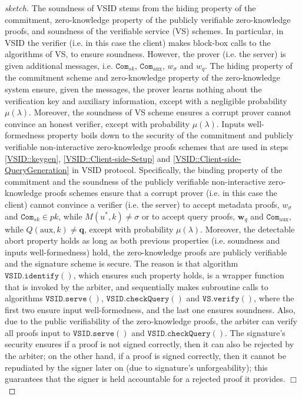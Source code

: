 
\begin{proof}[sketch] The soundness  of VSID  stems  from the hiding property of the commitment, zero-knowledge property of the publicly verifiable zero-knowledge proofs, and soundness of  the  verifiable service (VS) schemes. In particular, in VSID the verifier (i.e. in this case the client) makes block-box calls to the algorithms of   VS, to ensure soundness. However, the prover (i.e.  the server) is given  additional messages, i.e.   $\mathtt{Com}_{\scriptscriptstyle sk}$,  $\mathtt{Com}_{\scriptscriptstyle \text{aux}}$, $w_{\scriptscriptstyle\sigma}$ and $w_{\scriptscriptstyle q}$. The hiding property of the commitment scheme and zero-knowledge property of the zero-knowledge system ensure, given the messages, the prover learns nothing about the verification key and auxiliary information, except with a negligible probability $\mu(\lambda)$. Moreover, the soundness of VS scheme ensures a corrupt prover cannot convince an honest verifier, except with  probability $\mu(\lambda)$.   Inputs well-formedness property boils down to the security of the commitment and publicly verifiable non-interactive zero-knowledge proofs   schemes that are used in steps \ref{VSID::keygen}, \ref{VSID::Client-side-Setup} and \ref{VSID::Client-side-QueryGeneration} in VSID protocol. Specifically,  the binding property of the commitment and the soundness of the publicly verifiable non-interactive zero-knowledge proofs schemes  ensure that a corrupt prover (i.e. in this case the client) cannot convince a verifier (i.e. the server) to accept metadata proofs, $w_{\scriptscriptstyle\sigma}$ and $\mathtt{Com}_{\scriptscriptstyle sk}\in pk$, while  $M(u^{\scriptscriptstyle *},k)\neq \sigma $ or to accept query proofs, $\bm{w}_{\scriptscriptstyle q}$ and $\mathtt{Com}_{\scriptscriptstyle \text{aux}}$, while $Q(\text{aux},k)\neq \bm{q}$, except with  probability $\mu(\lambda)$.  Moreover, the detectable abort property holds as long as both previous properties (i.e. soundness and inputs well-formedness) hold, the zero-knowledge proofs are publicly verifiable and the signature scheme is secure. The reason is that algorithm $\mathtt{VSID.identify}()$, which  ensures such property  holds,  is a wrapper function that is invoked by the arbiter, and  sequentially makes subroutine calls to algorithms  $\mathtt{VSID.serve}()$,  $\mathtt{VSID.checkQuery}()$ and $\mathtt{VS.verify}()$,   where the first two ensure input well-formedness, and the last one ensures soundness. Also, due to the public verifiability of the zero-knowledge proofs, the arbiter can verify all proofs input to $\mathtt{VSID.serve}()$ and $\mathtt{VSID.checkQuery}()$. The signature's security ensures if a proof is not signed correctly, then it can also be rejected by the arbiter; on the other hand, if a proof is signed correctly, then  it cannot be repudiated by the signer later on (due to signature's unforgeability); this guarantees that the signer is held accountable for a rejected proof it provides.
  \hfill\(\Box\)\end{proof}
  
  
  
  
  
  